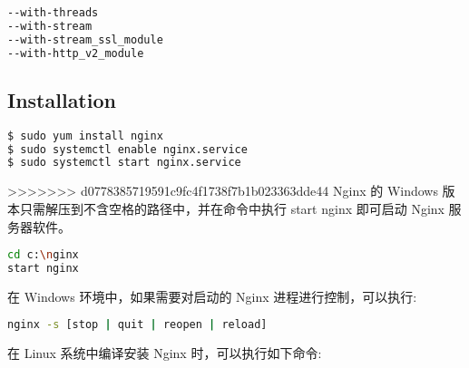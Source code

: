 \begin{lstlisting}[language=bash]
--with-threads
--with-stream
--with-stream_ssl_module
--with-http_v2_module
\end{lstlisting}


\subsection{Installation}


\begin{lstlisting}[language=bash]
$ sudo yum install nginx
$ sudo systemctl enable nginx.service
$ sudo systemctl start nginx.service
\end{lstlisting}



>>>>>>> d0778385719591c9fc4f1738f7b1b023363dde44
Nginx 的 Windows 版本只需解压到不含空格的路径中，并在命令中执行 start nginx 即可启动 Nginx 服务器软件。


\begin{lstlisting}[language=bash]
cd c:\nginx
start nginx
\end{lstlisting}


在 Windows 环境中，如果需要对启动的 Nginx 进程进行控制，可以执行:

\begin{lstlisting}[language=bash]
nginx -s [stop | quit | reopen | reload]
\end{lstlisting}


在 Linux 系统中编译安装 Nginx 时，可以执行如下命令:

